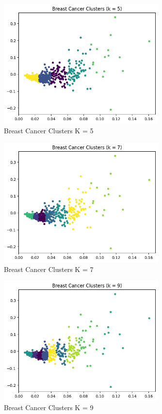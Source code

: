 \documentclass[12pt]{article}
\begin{document}
\begin{enumerate}
\begin{enumerate}
    \begin{figure}[H]
      \centering 
      \includegraphics[width=0.75\textwidth]{2_3_5.png}
      \caption{Breast Cancer Clusters K = 5}
    \end{figure}

    \begin{figure}[H]
      \centering 
      \includegraphics[width=0.75\textwidth]{2_3_7.png}
      \caption{Breast Cancer Clusters K = 7}
    \end{figure}

    \begin{figure}[H]
      \centering 
      \includegraphics[width=0.75\textwidth]{2_3_9.png}
      \caption{Breast Cancer Clusters K = 9}
    \end{figure}


\end{enumerate}
\end{enumerate}
\end{document}

